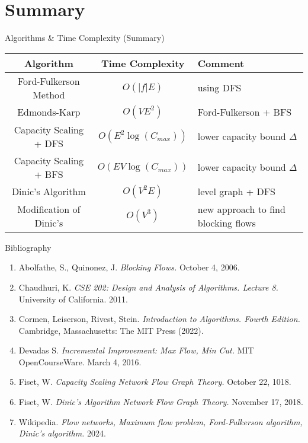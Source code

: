 \documentclass[aspectratio=169,c]{beamer} %
\begin{document}
\section{Summary}
\begin{frame}
    \begin{block}{Algorithms \& Time Complexity (Summary)}
        \begin{table}
            \begin{tabular}{c|c|l}
                Algorithm & Time Complexity & Comment \\ \hline
                Ford-Fulkerson Method & \(O(\lvert f\rvert E)\) & using DFS\\
                Edmonds-Karp & \(O(VE^2)\) & Ford-Fulkerson + BFS \\
                Capacity Scaling + DFS & \(O(E^2\log(C_{max}))\) & lower capacity bound \(\Delta\) \\
                Capacity Scaling + BFS & \(O(EV\log(C_{max}))\) & lower capacity bound \(\Delta\) \\
                Dinic's Algorithm & \(O(V^2E)\) & level graph + DFS \\
                Modification of Dinic's & \(O(V^3)\) & new approach to find blocking flows
            \end{tabular}        \end{table}
    \end{block}
\end{frame}

\begin{frame}{Bibliography}
    \begin{enumerate}
        \item Abolfathe, S., Quinonez, J. \textit{Blocking Flows.} October 4, 2006.
        \item Chaudhuri, K. \textit{CSE 202: Design and Analysis of Algorithms. Lecture 8.} University of California. 2011.
        \item Cormen, Leiserson, Rivest, Stein. \textit{Introduction to Algorithms. Fourth Edition.} Cambridge, Massachusetts: The MIT Press (2022).
        \item Devadas S. \textit{Incremental Improvement: Max Flow, Min Cut.} MIT OpenCourseWare. March 4, 2016.
        \item Fiset, W. \textit{Capacity Scaling \textbar Network Flow \textbar Graph Theory.} October 22, 1018.
        \item Fiset, W. \textit{Dinic's Algorithm \textbar Network Flow \textbar Graph Theory.} November 17, 2018.
        \item Wikipedia. \textit{Flow networks, Maximum flow problem, Ford-Fulkerson algorithm, Dinic's algorithm.} 2024.
    \end{enumerate}
\end{frame}
\end{document}
